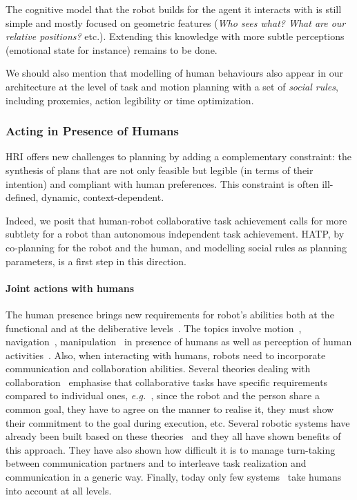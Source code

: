 \documentclass[preprint,3p,times]{elsarticle}
\newcommand{\eg}{{\textit{e.g.\ }}}
\begin{document}
The cognitive model that the robot builds for the agent it interacts with is
still simple and mostly focused on geometric features (\emph{Who sees what? What are
our relative positions?} etc.). Extending this knowledge with more subtle
perceptions (emotional state for instance) remains to be done.

We should also mention that modelling of human behaviours also appear in our
architecture at the level of task and motion planning with a set of
\emph{social rules}, including proxemics, action legibility or time
optimization.

\subsubsection{Acting in Presence of Humans}

HRI offers new challenges to planning
by adding a complementary constraint: the synthesis of plans that are not only
feasible but legible (in terms of their intention) and compliant with human
preferences. This constraint is often ill-defined, dynamic, context-dependent.

Indeed, we posit that human-robot collaborative task achievement calls for more
subtlety for a robot than autonomous independent task achievement. HATP, by
co-planning for the robot and the human, and modelling social rules as planning
parameters, is a first step in this direction.

\paragraph{Joint actions with humans}\label{sec:soa}
The human presence brings new requirements for robot's abilities both
at the functional and at the deliberative levels~\cite{Klein2004}. The
topics involve motion~\cite{Kulic2007,Berg2004,Madhava2006},
navigation~\cite{Althaus2004,Sisbot2007}, manipulation~\cite{Kemp2007}
in presence of humans as well as perception of human
activities~\cite{Breazeal2001,Burger2008}. Also, when
interacting with humans, robots need to incorporate communication and
collaboration abilities. Several theories dealing with
collaboration~\cite{Cohen1991,Grosz1996,Clark1996} emphasise that
collaborative tasks have specific requirements compared to individual
ones, \eg, since the robot and the person share a common goal, they
have to agree on the manner to realise it, they must show their
commitment to the goal during execution, etc. Several robotic systems
have already been built based on these
theories~\cite{Rich1997,Sidner2005,Breazeal2003} and they
all have shown benefits of this approach. They have also shown how
difficult it is to manage turn-taking between communication partners
and to interleave task realization and communication in a generic
way. Finally, today only few
systems~\cite{Fong2006,Breazeal2003,Sisbot2008} take humans into
account at all levels.
\end{document}
